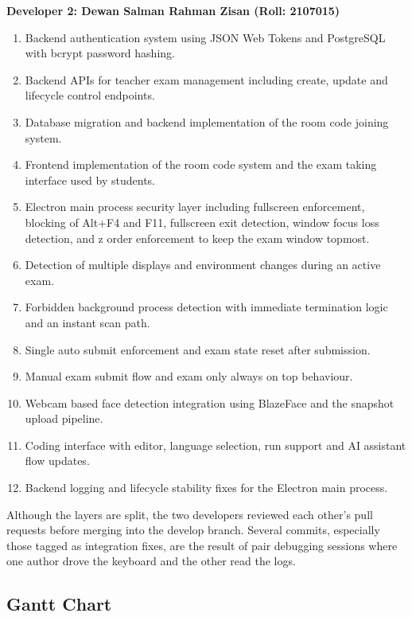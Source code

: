 \documentclass[12pt, a4paper]{report}
\begin{document}
\begin{justify}
{    \textbf{Developer 2: Dewan Salman Rahman Zisan (Roll: 2107015)}
    \begin{enumerate}
        \item Backend authentication system using JSON Web Tokens and PostgreSQL with bcrypt password hashing.
        \item Backend APIs for teacher exam management including create, update and lifecycle control endpoints.
        \item Database migration and backend implementation of the room code joining system.
        \item Frontend implementation of the room code system and the exam taking interface used by students.
        \item Electron main process security layer including fullscreen enforcement, blocking of Alt+F4 and F11, fullscreen exit detection, window focus loss detection, and z order enforcement to keep the exam window topmost.
        \item Detection of multiple displays and environment changes during an active exam.
        \item Forbidden background process detection with immediate termination logic and an instant scan path.
        \item Single auto submit enforcement and exam state reset after submission.
        \item Manual exam submit flow and exam only always on top behaviour.
        \item Webcam based face detection integration using BlazeFace and the snapshot upload pipeline.
        \item Coding interface with editor, language selection, run support and AI assistant flow updates.
        \item Backend logging and lifecycle stability fixes for the Electron main process.
    \end{enumerate}

    Although the layers are split, the two developers reviewed each other's pull requests before merging into the develop branch. Several commits, especially those tagged as integration fixes, are the result of pair debugging sessions where one author drove the keyboard and the other read the logs.
  }
\end{justify}

\subsection{Gantt Chart}
\end{document}
